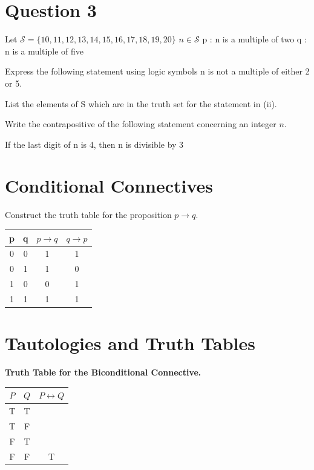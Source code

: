\documentclass[]{report}
\begin{document}
\section*{Question 3}

Let $\mathcal{S} = \{10,11,12,13,14,15,16,17,18,19,20\}$
$n  \in \mathcal{S}$
p : n is a multiple of two
q : n is a multiple of five

Express the following statement using logic symbols
n is not a multiple of either 2 or 5.

List the elements of S which are in the truth set for the statement in (ii).

Write the contrapositive of the following statement concerning an integer $n$.

If the last digit of n is 4, then n is divisible by 3

\section{Conditional Connectives}
Construct the truth table for the proposition $p \rightarrow q$.

\begin{center}
\begin{tabular}{|c|c|c|c|}
\hline
p & q & $p \rightarrow q$ & $q \rightarrow p$ \\
\hline
0 & 0 & 1& 1 \\
0 & 1 & 1 & 0 \\
1 & 0 & 0 & 1 \\
1 & 1 & 1 & 1 \\
\hline
\end{tabular}
\end{center}

\section{Tautologies and Truth Tables}
\textbf{Truth Table for the Biconditional Connective.} \bigskip
\begin{center}
\begin{tabular}{|c|c|c|}
\hline $P$  & $Q$ & $P \leftrightarrow Q$ \\ \hline
\hline T & T &   \\ 
\hline T & F &    \\ 
\hline F & T &    \\ 
\hline \phantom{sp}F \phantom{sp} & \phantom{sp}F \phantom{sp} & \phantom{sp}T \phantom{sp} \\
\hline 
\end{tabular} 
\end{center}
\end{document}
